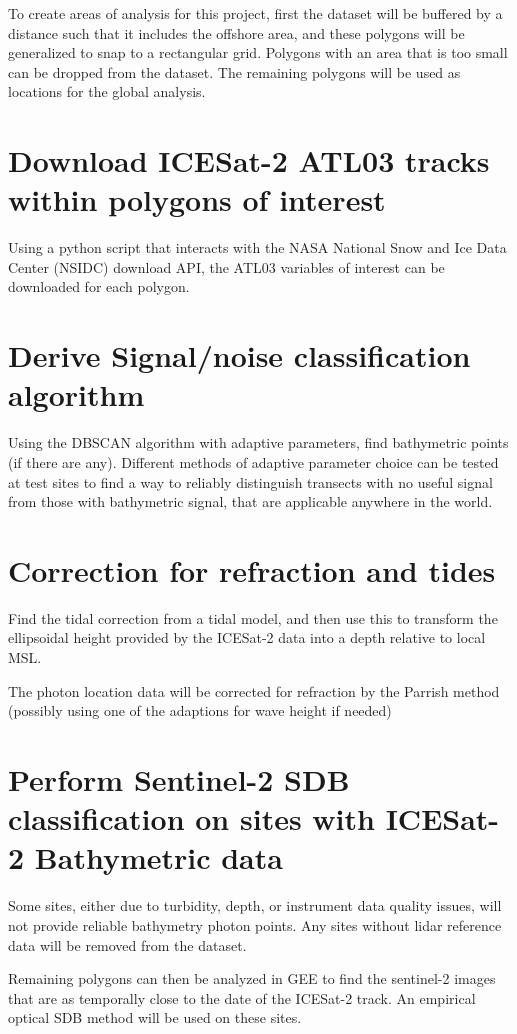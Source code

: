 To create areas of analysis for this project, first the \citeauthor{Giri2011b} dataset will be buffered by a distance such that it includes the offshore area, and these polygons will be generalized to snap to a rectangular grid. Polygons with an area that is too small can be dropped from the dataset. The remaining polygons will be used as locations for the global analysis.

\section{Download ICESat-2 ATL03 tracks within polygons of interest}
Using a python script that interacts with the NASA National Snow and Ice Data Center (NSIDC) download API, the ATL03 variables of interest can be downloaded for each polygon. 

\section{Derive Signal/noise classification algorithm}
Using the DBSCAN algorithm with adaptive parameters, find bathymetric points (if there are any). Different methods of adaptive parameter choice can be tested at test sites to find a way to reliably distinguish transects with no useful signal from those with bathymetric signal, that are applicable anywhere in the world.

\section{Correction for refraction and tides}
Find the tidal correction from a tidal model, and then use this to transform the ellipsoidal height provided by the ICESat-2 data into a depth relative to local MSL.

The photon location data will be corrected for refraction by the Parrish method (possibly using one of the adaptions for wave height if needed)

\section{Perform Sentinel-2 SDB classification on sites with ICESat-2 Bathymetric data}
Some sites, either due to turbidity, depth, or instrument data quality issues, will not provide reliable bathymetry photon points. Any sites without lidar reference data will be removed from the dataset. 

Remaining polygons can then be analyzed in GEE to find the sentinel-2 images that are as temporally close to the date of the ICESat-2 track. An empirical optical SDB method will be used on these sites. 

